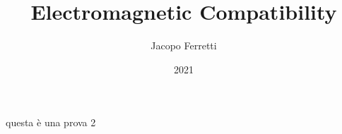 \documentclass{article}
\title{Electromagnetic Compatibility}
\date{2021}
\author{Jacopo Ferretti}
\numberwithin{equation}{section}
\begin{document}
\maketitle
\newpage
\tableofcontents
\newpage
questa è una prova 2


\end{document}
